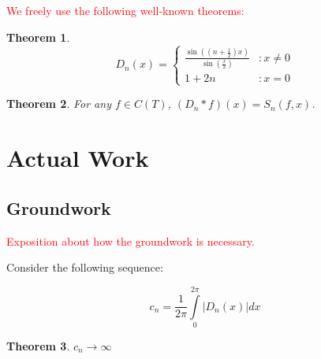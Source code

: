 \documentclass{amsart}
\newtheorem{thm}{Theorem}[section]
\theoremstyle{definition}
\begin{document}
\textcolor{red}{We freely use the following well-known theorems:}

\begin{thm}
\begin{displaymath}
   D_n(x) = \left\{
     \begin{array}{lr}
       \frac{\sin((n+\frac{1}{2})x)}{\sin(\frac{x}{2})} & : x \neq 0 \\
       1+2n & : x=0
     \end{array}
   \right.
\end{displaymath}
\end{thm}

\begin{thm}
For any $f \in C(T)$, $(D_n \ast f)(x) = S_n(f,x)$. 
\end{thm}

\section{Actual Work}

\subsection{Groundwork}

\textcolor{red}{Exposition about how the groundwork is necessary.}

Consider the following sequence:

\begin{displaymath}
c_n = \frac{1}{2 \pi} \int\limits_0^{2\pi} |D_n(x)| dx
\end{displaymath}

\begin{thm}
$c_n \to \infty$
\end{thm}
\end{document}
